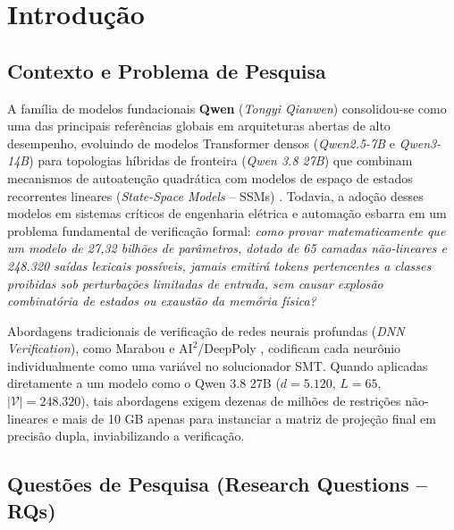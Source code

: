 \documentclass[11pt,a4paper]{article}
\theoremstyle{definition}
\begin{document}
\newpage
\tableofcontents
\newpage

\section{Introdução}

\subsection{Contexto e Problema de Pesquisa}

A família de modelos fundacionais \textbf{Qwen} (\textit{Tongyi Qianwen}) consolidou-se como uma das principais referências globais em arquiteturas abertas de alto desempenho, evoluindo de modelos Transformer densos (\textit{Qwen2.5-7B} e \textit{Qwen3-14B}) para topologias híbridas de fronteira (\textit{Qwen 3.8 27B}) que combinam mecanismos de autoatenção quadrática com modelos de espaço de estados recorrentes lineares (\textit{State-Space Models} -- SSMs) \cite{dao2024,qwen2025}. Todavia, a adoção desses modelos em sistemas críticos de engenharia elétrica e automação esbarra em um problema fundamental de verificação formal: \textit{como provar matematicamente que um modelo de 27,32 bilhões de parâmetros, dotado de 65 camadas não-lineares e 248.320 saídas lexicais possíveis, jamais emitirá tokens pertencentes a classes proibidas sob perturbações limitadas de entrada, sem causar explosão combinatória de estados ou exaustão da memória física?}

Abordagens tradicionais de verificação de redes neurais profundas (\textit{DNN Verification}), como Marabou \cite{katz2019} e $\text{AI}^2$/DeepPoly \cite{gehr2018,singh2019}, codificam cada neurônio individualmente como uma variável no solucionador SMT. Quando aplicadas diretamente a um modelo como o Qwen 3.8 27B ($d = 5.120$, $L = 65$, $|\mathcal{V}| = 248.320$), tais abordagens exigem dezenas de milhões de restrições não-lineares e mais de 10 GB apenas para instanciar a matriz de projeção final em precisão dupla, inviabilizando a verificação.

\subsection{Questões de Pesquisa (Research Questions -- RQs)}
\end{document}
